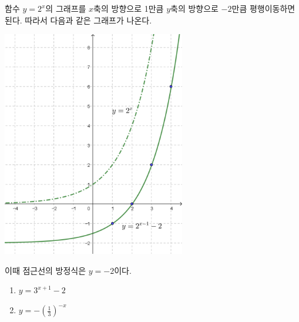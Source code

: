 \documentclass{oblivoir}
\begin{document}
\newpage
%
\label{exp4}
\begin{mdframed}
함수 \(y=2^x\)의 그래프를 \(x\)축의 방향으로 1만큼 \(y\)축의 방향으로 \(-2\)만큼 평행이동하면 된다.
따라서 다음과 같은 그래프가 나온다.
\begin{center}
\includegraphics[width=0.6\textwidth]{exp_4}
\end{center}
이때 점근선의 방정식은 \(y=-2\)이다.
\end{mdframed}

\newpage
%
\label{exp5}
\begin{enumerate}
\item
\(y=3^{x+1}-2\)
\item
\(y=-(\frac13)^{-x}\)
\end{enumerate}
\end{document}
